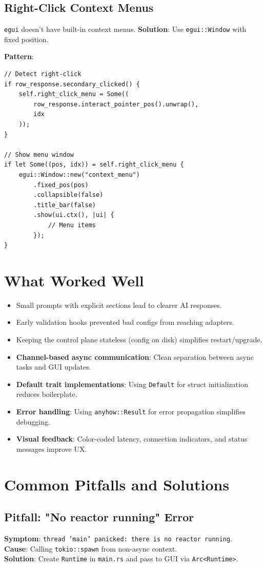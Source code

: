 \subsection{Right-Click Context Menus}

\texttt{egui} doesn't have built-in context menus. \textbf{Solution}: Use \texttt{egui::Window} with fixed position.

\textbf{Pattern}:
\begin{verbatim}
// Detect right-click
if row_response.secondary_clicked() {
    self.right_click_menu = Some((
        row_response.interact_pointer_pos().unwrap(),
        idx
    ));
}

// Show menu window
if let Some((pos, idx)) = self.right_click_menu {
    egui::Window::new("context_menu")
        .fixed_pos(pos)
        .collapsible(false)
        .title_bar(false)
        .show(ui.ctx(), |ui| {
            // Menu items
        });
}
\end{verbatim}

\section{What Worked Well}
\begin{itemize}
    \item Small prompts with explicit sections lead to clearer AI responses.
    \item Early validation hooks prevented bad configs from reaching adapters.
    \item Keeping the control plane stateless (config on disk) simplifies restart/upgrade.
    \item \textbf{Channel-based async communication}: Clean separation between async tasks and GUI updates.
    \item \textbf{Default trait implementations}: Using \texttt{Default} for struct initialization reduces boilerplate.
    \item \textbf{Error handling}: Using \texttt{anyhow::Result} for error propagation simplifies debugging.
    \item \textbf{Visual feedback}: Color-coded latency, connection indicators, and status messages improve UX.
\end{itemize}

\section{Common Pitfalls and Solutions}

\subsection{Pitfall: "No reactor running" Error}
\textbf{Symptom}: \texttt{thread 'main' panicked: there is no reactor running}.\\
\textbf{Cause}: Calling \texttt{tokio::spawn} from non-async context.\\
\textbf{Solution}: Create \texttt{Runtime} in \texttt{main.rs} and pass to GUI via \texttt{Arc<Runtime>}.

